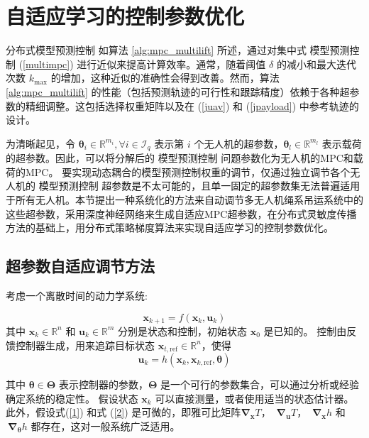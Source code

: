 \documentclass[lang=chs, degree=master, blindreview=true, winfonts=true]{yanputhesis}
\begin{document}
\section{自适应学习的控制参数优化}

分布式模型预测控制 如算法 \ref{alg:mpc_multilift} 所述，通过对集中式 模型预测控制 (\ref{multimpc}) 进行近似来提高计算效率。通常，随着阈值 \(\delta\) 的减小和最大迭代次数 \(k_{\text{max}}\) 的增加，这种近似的准确性会得到改善。然而，算法 \ref{alg:mpc_multilift} 的性能（包括预测轨迹的可行性和跟踪精度）依赖于各种超参数的精细调整。这包括选择权重矩阵以及在 (\ref{juav}) 和 (\ref{jpayload}) 中参考轨迹的设计。

为清晰起见，令 \(\bm \theta_i \in \mathbb{R}^{m_i}, \forall i \in \mathcal{I}_q\) 表示第 \(i\) 个无人机的超参数，\(\bm \theta_l \in \mathbb{R}^{m_l}\) 表示载荷的超参数。因此，可以将分解后的 模型预测控制 问题参数化为无人机的MPC和载荷的MPC。
要实现动态耦合的模型预测控制权重的调节，仅通过独立调节各个无人机的 模型预测控制 超参数是不太可能的，且单一固定的超参数集无法普遍适用于所有无人机。本节提出一种系统化的方法来自动调节多无人机绳系吊运系统中的这些超参数，采用深度神经网络来生成自适应MPC超参数，在分布式灵敏度传播方法的基础上，用分布式策略梯度算法来实现自适应学习的控制参数优化。

\subsection{超参数自适应调节方法}
考虑一个离散时间的动力学系统:

\begin{equation}
    \bm x_{k+1} = f(\bm x_k, \bm u_k)
	\label{1}
\end{equation}
其中 \( \bm x_k \in \mathbb{R}^n \) 和 \( \bm u_k \in \mathbb{R}^m \) 分别是状态和控制，初始状态 \( \bm x_0 \) 是已知的。  
控制由反馈控制器生成，用来追踪目标状态 \( \bm x_{t,\text{ref}} \in \mathbb{R}^n \)，使得
\begin{equation}
    \bm u_k = h(\bm x_k, \bm x_{k,\text{ref}}, \bm \theta)
	\label{2}
\end{equation}

其中 \( \bm \theta \in \bm \Theta \) 表示控制器的参数，\( \bm \Theta \) 是一个可行的参数集合，可以通过分析或经验确定系统的稳定性。  
假设状态 \( {\bm x}_k \) 可以直接测量，或者使用适当的状态估计器。此外，假设式(\ref{1}) 和式 (\ref{2}) 是可微的，即雅可比矩阵$\bm \nabla_{\bm x} T$， $\ \bm \nabla_{\bm u} T$， $\ \bm \nabla_{\bm x} h$ 和 $\ \bm \nabla_{\bm \theta} h$
都存在，这对一般系统广泛适用。
\end{document}
